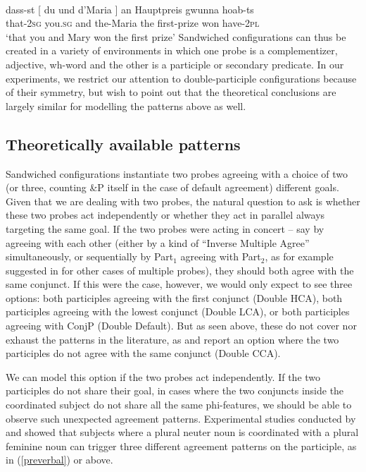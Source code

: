 \documentclass[output=paper
,modfonts
,nonflat]{langsci/langscibook}
\begin{document}
\ea {}\\
\gll dass-st [ du         und d’Maria ] an Hauptpreis gwunna hoab-ts\\
that-\textsc{2sg} {} you.\textsc{sg} and the-Maria {} the first-prize won have-\textsc{2pl}\\
\glt `that you and Mary won the first prize'
\z
Sandwiched configurations can thus be created in a variety of environments in which one probe is a complementizer, adjective, wh-word and the other is a participle or secondary predicate. In our experiments, we restrict our attention to double-participle configurations because of their symmetry, but wish to point out that the theoretical conclusions are largely similar for modelling the patterns above as well.

\subsection{Theoretically available patterns}

Sandwiched configurations instantiate two probes agreeing with a choice of two (or three, counting \&P itself in the case of default agreement) different goals. Given that we are dealing with two probes, the natural question to ask is whether these two probes act independently or whether they act in parallel always targeting the same goal. If the two probes were acting in concert -- say by agreeing with each other (either by a kind of ``Inverse Multiple Agree'' simultaneously, or sequentially by Part$_1$ agreeing with Part$_2$, as for example suggested in \citet{puskarmurphy:17} for other cases of multiple probes), they should both agree with the same conjunct. If this were the case, however, we would only expect to see three options: both participles agreeing with the first conjunct (Double HCA), both participles agreeing with the lowest conjunct (Double LCA), or both participles agreeing with ConjP (Double Default). But as seen above, these do not cover nor exhaust the patterns in the literature, as \cite{marusicnevinssaksida:07} and \cite{marusicnevinsbadecker:15} report an option where the two participles do not agree with the same conjunct (Double CCA).

We can model this option if the two probes act independently. If the two participles do not share their goal, in cases where the two conjuncts inside the coordinated subject do not share all the same phi-features, we should be able to observe such unexpected agreement patterns. Experimental studies conducted by \cite{marusicnevinsbadecker:15} and \cite{willergold:16} showed that subjects where a plural neuter noun is coordinated with a plural feminine noun can trigger three different agreement patterns on the participle, as in (\ref{preverbal}) or  above.
\end{document}
